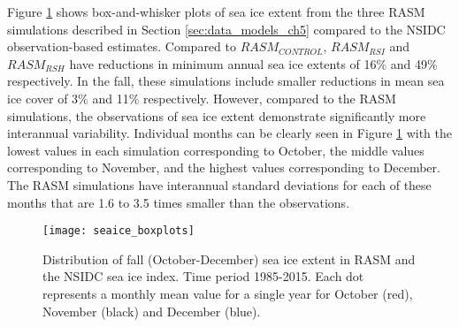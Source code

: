 Figure \ref{fig:sea_ice_box} shows box-and-whisker plots of sea ice extent from the three RASM simulations described in Section \ref{sec:data_models_ch5} compared to the NSIDC observation-based estimates.
Compared to $RASM_{CONTROL}$, $RASM_{RSI}$ and $RASM_{RSH}$ have reductions in minimum annual sea ice extents of 16\% and 49\% respectively.
In the fall, these simulations include smaller reductions in mean sea ice cover of 3\% and 11\% respectively.
However, compared to the RASM simulations, the observations of sea ice extent demonstrate significantly more interannual variability.
Individual months can be clearly seen in Figure \ref{fig:sea_ice_box} with the lowest values in each simulation corresponding to October, the middle values corresponding to November, and the highest values corresponding to December.
The RASM simulations have interannual standard deviations for each of these months that are 1.6 to 3.5 times smaller than the observations.

\begin{figure}
  \centering
  \texttt{[image: seaice\_boxplots]}
  \caption{Distribution of fall (October-December) sea ice extent in RASM and the NSIDC sea ice index. Time period 1985-2015. Each dot represents a monthly mean value for a single year for October (red), November (black) and December (blue).}
  \label{fig:sea_ice_box}
\end{figure}

